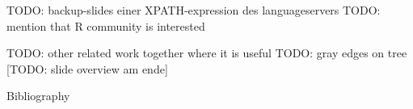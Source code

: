


\titleframe











\begin{frame}
   TODO: backup-slides einer XPATH-expression des languageservers
   TODO: mention that R community is interested
\end{frame}
\begin{frame}
TODO: other related work together where it is useful
TODO: gray edges on tree
[TODO: slide overview am ende]
\end{frame}




\begin{frame}{Bibliography}
   \printBibCommand
\end{frame}

